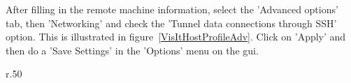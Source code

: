 \documentclass[11pt,fleqn]{book} %
\begin{document}
After filling in the remote machine information, select the 'Advanced
options' tab, then 'Networking' and check the 'Tunnel data connections
through SSH' option. This is illustrated in
figure~\ref{VisItHostProfileAdv}. Click on 'Apply' and then do a 'Save
Settings' in the 'Options' menu on the gui.










\begin{wrapfigure}{r}{.50\textwidth}
  \centering
  \vspace{5pt}
  \hspace{20pt}
  \caption{}
  \vspace{-10pt}
  \label{}
\end{wrapfigure}
\end{document}
